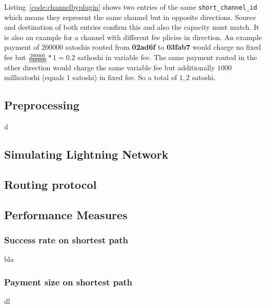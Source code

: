 \documentclass[final]{fhnwreport}       %
\begin{document}
Listing~\ref{code:channelbyplugin} shows two entries of the same \texttt{short\_channel\_id} which means they represent the same channel but in opposite directions. Source and destination of both entries confirm this and also the capacity must match. It is also an example for a channel with different fee plicies in direction. An example payment of $200000$ satoshis routed from \textbf{02ad6f} to \textbf{03fab7} would charge no fixed fee but $\frac{200000}{1000000}*1 = 0.2$ sathoshi in variable fee. The same payment routed in the other direction would charge the same variable fee but additionally $1000$ millisatoshi (equals 1 satoshi) in fixed fee. So a total of $1,2$ satoshi.

\subsection{Preprocessing}
d
\subsection{Simulating Lightning Network}

\subsection{Routing protocol}

\subsection{Performance Measures}
\subsubsection{Success rate on shortest path}
bla
\subsubsection{Payment size on shortest path}
dl
\end{document}
